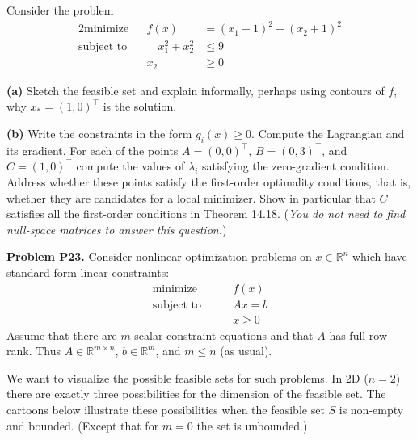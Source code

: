 \documentclass[12pt]{amsart}
\newcommand{\RR}{\mathbb{R}}
\newcommand{\prob}[1]{\bigskip\noindent\textbf{#1}\quad }
\newcommand{\epart}[1]{\medskip\noindent\textbf{(#1)}\quad }
\begin{document}
\medskip
Consider the problem
\begin{alignat*}{2}
    \text{minimize}   &&  f(x) &= (x_1-1)^2 + (x_2+1)^2 \\
    \text{subject to} && \quad x_1^2 + x_2^2 &\le 9 \\
                      &&        x_2 &\ge 0
\end{alignat*}

\epart{a}  Sketch the feasible set and explain informally, perhaps using contours of $f$, why $x_*=(1,0)^\top$ is the solution.

\epart{b}  Write the constraints in the form $g_i(x)\ge 0$.  Compute the Lagrangian and its gradient.  For each of the points $A = (0,0)^\top$, $B=(0,3)^\top$, and $C=(1,0)^\top$ compute the values of $\lambda_i$ satisfying the zero-gradient condition.  Address whether these points satisfy the first-order optimality conditions, that is, whether they are candidates for a local minimizer.  Show in particular that $C$ satisfies all the first-order conditions in Theorem 14.18.  (\emph{You do \emph{not} need to find null-space matrices to answer this question.})


\medskip
\prob{Problem P23.}  Consider nonlinear optimization problems on $x\in \RR^n$ which have standard-form linear constraints:
    $$\begin{matrix}
    \text{minimize} \qquad & f(x) \\
    \text{subject to} \qquad & Ax = b \\
                      & x \ge 0
    \end{matrix}$$
Assume that there are $m$ scalar constraint equations and that $A$ has full row rank.  Thus $A\in \RR^{m\times n}$, $b\in \RR^m$, and $m\le n$ (as usual).

We want to visualize the possible feasible sets for such problems.  In 2D ($n=2$) there are exactly three possibilities for the dimension of the feasible set.  The cartoons below illustrate these possibilities when the feasible set $S$ is non-empty and bounded.  (Except that for $m=0$ the set is unbounded.)

\bigskip
{}
\qquad
{}
\qquad
{}
\end{document}
